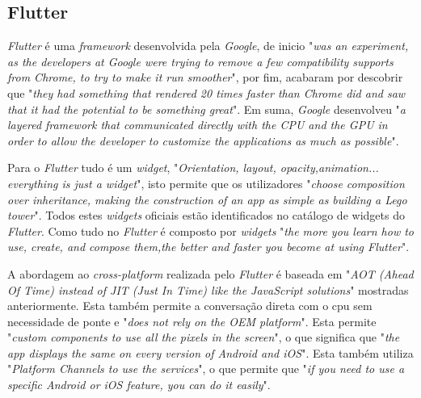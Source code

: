\subsection{Flutter}
\textit{Flutter} é uma \textit{framework} desenvolvida pela \textit{Google}, de inicio "\emph{was an experiment, as the developers at Google were trying to remove a few compatibility supports from Chrome, to try to make it run smoother}"\citep{flutter}, por fim, acabaram por descobrir que "\emph{they had something that rendered 20 times faster than Chrome did and saw that it had the potential to be something great}"\citep{flutter}. Em suma, \textit{Google} desenvolveu "\emph{a layered framework that communicated directly with the CPU and the GPU in order to allow the developer to customize the applications as much as possible}"\citep{flutter}.

Para o \textit{Flutter} tudo é um \textit{widget}, "\emph{Orientation, layout, opacity,animation... everything is just a widget}"\citep{flutter}, isto permite que os utilizadores "\emph{choose composition over inheritance, making the construction of an app as simple as building a Lego tower}"\citep{flutter}. Todos estes \textit{widgets} oficiais estão identificados no catálogo de widgets do \textit{Flutter}. Como tudo no \textit{Flutter} é composto por \textit{widgets} "\emph{the more you learn how to use, create, and compose them,the better and faster you become at using Flutter}"\citep{flutter}.

A abordagem ao \textit{cross-platform} realizada pelo \textit{Flutter} é baseada em  "\emph{AOT (Ahead Of Time) instead of JIT (Just In Time) like the JavaScript solutions}"\citep{flutter} mostradas anteriormente. Esta também permite a conversação direta com o cpu sem necessidade de ponte e "\emph{does not rely on the OEM platform}"\citep{flutter}. Esta permite "\emph{custom components to use all the pixels in the screen}"\citep{flutter}, o que significa que "\emph{the app displays the same on every version of Android and iOS}"\citep{flutter}. Esta também utiliza "\emph{Platform Channels to use the services}"\citep{flutter}, o que permite que "\emph{if you need to use a specific Android or iOS feature, you can do it easily}"\citep{flutter}.